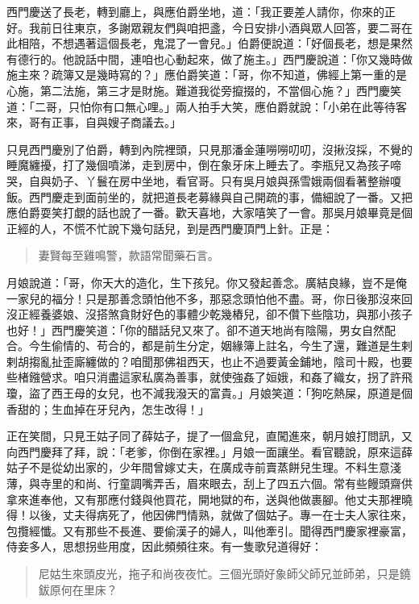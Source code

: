 西門慶送了長老，轉到廳上，與應伯爵坐地，道：「我正要差人請你，你來的正好。我前日往東京，多謝眾親友們與咱把盞，今日安排小酒與眾人回答，要二哥在此相陪，不想遇著這個長老，鬼混了一會兒。」伯爵便說道：「好個長老，想是果然有德行的。他說話中間，連咱也心動起來，做了施主。」西門慶說道：「你又幾時做施主來？疏簿又是幾時寫的？」應伯爵笑道：「哥，你不知道，佛經上第一重的是心施，第二法施，第三才是財施。難道我從旁攛掇的，不當個心施？」西門慶笑道：「二哥，只怕你有口無心哩。」兩人拍手大笑，應伯爵就說：「小弟在此等待客來，哥有正事，自與嫂子商議去。」

只見西門慶別了伯爵，轉到內院裡頭，只見那潘金蓮嘮嘮叨叨，沒揪沒採，不覺的睡魔纏擾，打了幾個噴涕，走到房中，倒在象牙床上睡去了。李瓶兒又為孩子啼哭，自與奶子、丫鬟在房中坐地，看官哥。只有吳月娘與孫雪娥兩個看著整辦嗄飯。西門慶走到面前坐的，就把道長老募緣與自己開疏的事，備細說了一番。又把應伯爵耍笑打覷的話也說了一番。歡天喜地，大家嘻笑了一會。那吳月娘畢竟是個正經的人，不慌不忙說下幾句話兒，到是西門慶頂門上針。正是：
\begin{quote}
妻賢每至雞鳴警，款語常聞藥石言。
\end{quote}

月娘說道：「哥，你天大的造化，生下孩兒。你又發起善念。廣結良緣，豈不是俺一家兒的福分！只是那善念頭怕他不多，那惡念頭怕他不盡。哥，你日後那沒來回沒正經養婆娘、沒搭煞貪財好色的事體少乾幾樁兒，卻不儹下些陰功，與那小孩子也好！」西門慶笑道：「你的醋話兒又來了。卻不道天地尚有陰陽，男女自然配合。今生偷情的、苟合的，都是前生分定，姻緣簿上註名，今生了還，難道是生剌剌胡搊亂扯歪廝纏做的？咱聞那佛祖西天，也止不過要黃金鋪地，陰司十殿，也要些楮鏹營求。咱只消盡這家私廣為善事，就使強姦了姮娥，和姦了織女，拐了許飛瓊，盜了西王母的女兒，也不減我潑天的富貴。」月娘笑道：「狗吃熱屎，原道是個香甜的；生血掉在牙兒內，怎生改得！」

正在笑間，只見王姑子同了薛姑子，提了一個盒兒，直闖進來，朝月娘打問訊，又向西門慶拜了拜，說：「老爹，你倒在家裡。」月娘一面讓坐。看官聽說，原來這薛姑子不是從幼出家的，少年間曾嫁丈夫，在廣成寺前賣蒸餅兒生理。不料生意淺薄，與寺里的和尚、行童調嘴弄舌，眉來眼去，刮上了四五六個。常有些饅頭齋供拿來進奉他，又有那應付錢與他買花，開地獄的布，送與他做裹腳。他丈夫那裡曉得！以後，丈夫得病死了，他因佛門情熟，就做了個姑子。專一在士夫人家往來，包攬經懺。又有那些不長進、要偷漢子的婦人，叫他牽引。聞得西門慶家裡豪富，侍妾多人，思想拐些用度，因此頻頻往來。有一隻歌兒道得好：
\begin{quote}
尼姑生來頭皮光，拖子和尚夜夜忙。三個光頭好象師父師兄並師弟，只是鐃鈸原何在里床？
\end{quote}

